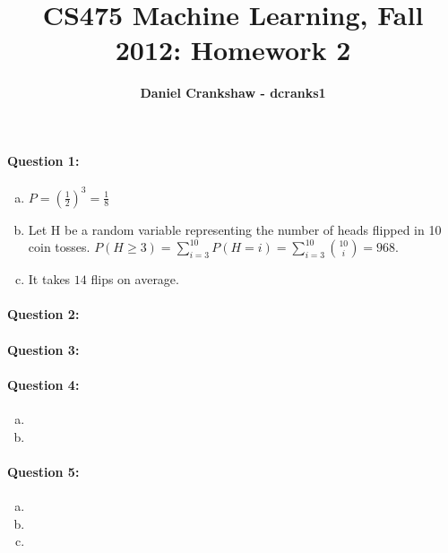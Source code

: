 \documentclass[letterpaper,11pt]{article}
\title{CS475 Machine Learning, Fall 2012: Homework 2}
\date{}
\author{\bf Daniel Crankshaw - dcranks1}
\begin{document}
\maketitle


\paragraph{Question 1:}
\begin{enumerate}[(a)]
\item $P = \left(\frac{1}{2}\right)^3 = \frac{1}{8}$
\item Let H be a random variable representing the number of heads flipped in 10 coin
tosses. $P(H \geq 3) = \sum\limits_{i=3}^{10} P(H=i) = \sum\limits_{i=3}^{10} \binom{10}{i}
= 968$.
\item It takes $14$ flips on average.
\end{enumerate}

\paragraph{Question 2:}

\paragraph{Question 3:}

\paragraph{Question 4:}
\begin{enumerate}[(a)]
\item
\item
\end{enumerate}

\paragraph{Question 5:}
\begin{enumerate}[(a)]
\item
\item
\item
\end{enumerate}
\end{document}

